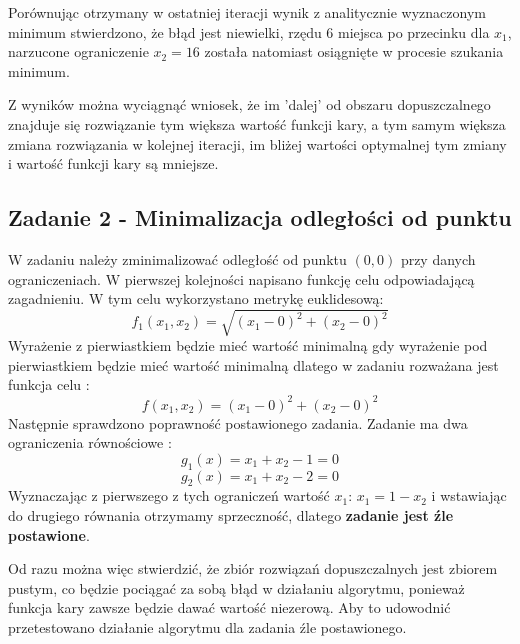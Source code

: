 \documentclass[a4paper,15pt]{article}
\begin{document}
Porównując otrzymany w ostatniej iteracji wynik z analitycznie wyznaczonym minimum stwierdzono, że błąd jest niewielki, rzędu 6 miejsca po przecinku dla \( x_{1} \), narzucone ograniczenie \(x_{2} = 16 \) została natomiast osiągnięte w procesie szukania minimum.  

Z wyników można wyciągnąć wniosek, że im 'dalej' od obszaru dopuszczalnego znajduje się rozwiązanie tym większa wartość funkcji kary, a tym samym większa zmiana rozwiązania w kolejnej iteracji, im bliżej wartości optymalnej tym zmiany i wartość funkcji kary są mniejsze. 
 
\subsection{Zadanie 2 - Minimalizacja odległości od punktu}
W zadaniu należy zminimalizować odległość od punktu \( (0,0) \) przy danych ograniczeniach. W pierwszej kolejności napisano funkcję celu odpowiadającą zagadnieniu. W tym celu wykorzystano metrykę euklidesową: 
\begin{equation*}
f_{1}(x_{1},x_{2}) = \sqrt{(x_{1}-0)^{2}+(x_{2}-0)^{2}}
\end{equation*}
Wyrażenie z pierwiastkiem będzie mieć wartość minimalną gdy wyrażenie pod pierwiastkiem będzie mieć wartość minimalną dlatego w zadaniu rozważana jest funkcja celu :
\begin{equation*}
f(x_{1},x_{2}) = (x_{1}-0)^{2}+(x_{2}-0)^{2}
\end{equation*}
Następnie sprawdzono poprawność postawionego zadania. Zadanie ma dwa ograniczenia równościowe :
\begin{equation*}
g_{1}(x) = x_{1}+x_{2}-1 = 0
\end{equation*}
\begin{equation*}
g_{2}(x) = x_{1}+x_{2}-2 = 0
\end{equation*}
Wyznaczając z pierwszego z tych ograniczeń wartość \( x_{1} \):
\( x_{1}=1-x_{2} \) i wstawiając do drugiego równania otrzymamy sprzeczność, dlatego \textbf{zadanie jest źle postawione}. 

Od razu można więc stwierdzić, że zbiór rozwiązań dopuszczalnych jest zbiorem pustym, co będzie pociągać za sobą błąd w działaniu algorytmu, ponieważ funkcja kary zawsze będzie dawać wartość niezerową. Aby to udowodnić przetestowano działanie algorytmu dla zadania źle postawionego. 
\end{document}
